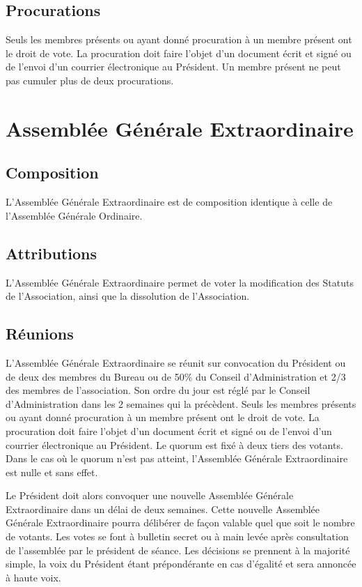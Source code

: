 \documentclass[12pt]{article}
\begin{document}
\subsection{Procurations}
\label{sec:ag:procurations}

Seuls les membres présents ou ayant donné procuration à un membre présent ont le droit de vote. La
procuration doit faire l’objet d’un document écrit et signé ou de l’envoi d’un courrier électronique au
Président. Un membre présent ne peut pas cumuler plus de deux procurations.

\section{Assemblée Générale Extraordinaire}
\label{sec:ago}

\subsection{Composition}
\label{sec:ago:composition}
L’Assemblée Générale Extraordinaire est de composition identique à celle de l’Assemblée Générale Ordinaire.

\subsection{Attributions}
\label{sec:ago:attributions}
L’Assemblée Générale Extraordinaire permet de voter la modification des Statuts de l’Association, ainsi que
la dissolution de l’Association.

\subsection{Réunions}
\label{sec:ago:reunions}
L’Assemblée Générale Extraordinaire se réunit sur convocation du Président ou de deux des membres du
Bureau ou de 50\% du Conseil d’Administration et 2/3 des membres de l’association.
Son ordre du jour est réglé par le Conseil d’Administration dans les 2 semaines qui la précèdent.
Seuls les membres présents ou ayant donné procuration à un membre présent ont le droit de vote. La
procuration doit faire l’objet d’un document écrit et signé ou de l’envoi d’un courrier électronique au
Président.
Le quorum est fixé à deux tiers des votants. Dans le cas où le quorum n’est pas atteint, l’Assemblée Générale
Extraordinaire est nulle et sans effet.

Le Président doit alors convoquer une nouvelle Assemblée Générale Extraordinaire dans un délai de deux
semaines. Cette nouvelle Assemblée Générale Extraordinaire pourra délibérer de façon valable quel que soit
le nombre de votants.
Les votes se font à bulletin secret ou à main levée après consultation de l’assemblée par le président de
séance. Les décisions se prennent à la majorité simple, la voix du Président étant prépondérante en cas
d’égalité et sera annoncée à haute voix.
\end{document}
